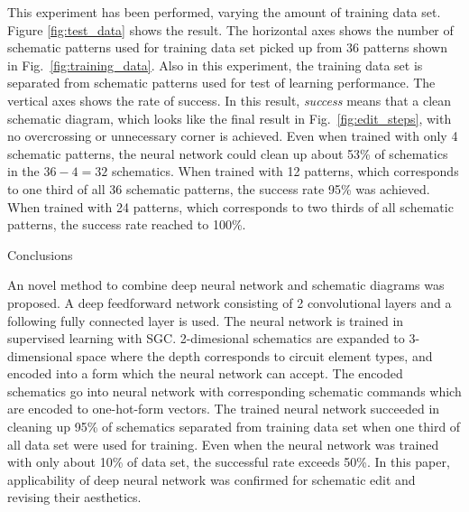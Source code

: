 \documentclass[twocolumn]{article}
\makeatletter
\def\section{\@startsection {section}{1}{\z@}{20pt plus 2pt minus 2pt}
{8pt plus 2pt minus 2pt}{\centering\normalsize\sc
\edef\@svsec{\thesection.\ }}}
\def\thesection{\Roman{section}}
\makeatother
\begin{document}
This experiment has been performed, varying the amount of training data set.
Figure \ref{fig:test_data} shows the result.
The horizontal axes shows the number of schematic patterns
used for training data set picked up from 36 patterns
shown in Fig.\ \ref{fig:training_data}.
Also in this experiment,
the training data set is separated from schematic patterns
used for test of learning performance.
The vertical axes shows the rate of success.
In this result, {\it success} means that a clean schematic diagram,
which looks like the final result in Fig.\ \ref{fig:edit_steps},
with no overcrossing or unnecessary corner is achieved.
Even when trained with only 4 schematic patterns,
the neural network could clean up about 53\% of schematics
in the $36 - 4 = 32$ schematics.
When trained with 12 patterns,
which corresponds to one third of all 36 schematic patterns,
the success rate 95\% was achieved.
When trained with 24 patterns,
which corresponds to two thirds of all schematic patterns,
the success rate reached to 100\%.

\section{Conclusions}

An novel method to combine deep neural network and schematic diagrams
was proposed.
A deep feedforward network consisting of 2 convolutional layers
and a following fully connected layer is used.
The neural network is trained in supervised learning with SGC.
2-dimesional schematics are expanded to 3-dimensional space
where the depth corresponds to circuit element types,
and encoded into a form which the neural network can accept.
The encoded schematics go into neural network with corresponding
schematic commands which are encoded to one-hot-form vectors.
The trained neural network succeeded in cleaning up 95\% of schematics
separated from training data set when one third of all data set were used
for training.
Even when the neural network was trained with only about 10\% of data set,
the successful rate exceeds 50\%.
In this paper,
applicability of deep neural network was confirmed
for schematic edit and revising their aesthetics.

\end{document}
